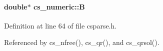 \hypertarget{structcs__numeric_ad81bc354670c58c7e715293e98316152}{
\paragraph[{B}]{\setlength{\rightskip}{0pt plus 5cm}double$\ast$ cs\-\_\-numeric\-::\-B}}\label{structcs__numeric_ad81bc354670c58c7e715293e98316152}


Definition at line 64 of file csparse.\-h.



Referenced by cs\-\_\-nfree(), cs\-\_\-qr(), and cs\-\_\-qrsol().


